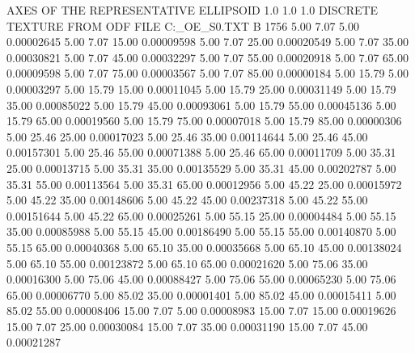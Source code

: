 AXES OF THE REPRESENTATIVE ELLIPSOID
   1.0   1.0   1.0
DISCRETE TEXTURE FROM ODF FILE  C:\TEXTURES\STEEL_OE\STEEL_S0.TXT       
B    1756
      5.00      7.07      5.00     0.00002645
      5.00      7.07     15.00     0.00009598
      5.00      7.07     25.00     0.00020549
      5.00      7.07     35.00     0.00030821
      5.00      7.07     45.00     0.00032297
      5.00      7.07     55.00     0.00020918
      5.00      7.07     65.00     0.00009598
      5.00      7.07     75.00     0.00003567
      5.00      7.07     85.00     0.00000184
      5.00     15.79      5.00     0.00003297
      5.00     15.79     15.00     0.00011045
      5.00     15.79     25.00     0.00031149
      5.00     15.79     35.00     0.00085022
      5.00     15.79     45.00     0.00093061
      5.00     15.79     55.00     0.00045136
      5.00     15.79     65.00     0.00019560
      5.00     15.79     75.00     0.00007018
      5.00     15.79     85.00     0.00000306
      5.00     25.46     25.00     0.00017023
      5.00     25.46     35.00     0.00114644
      5.00     25.46     45.00     0.00157301
      5.00     25.46     55.00     0.00071388
      5.00     25.46     65.00     0.00011709
      5.00     35.31     25.00     0.00013715
      5.00     35.31     35.00     0.00135529
      5.00     35.31     45.00     0.00202787
      5.00     35.31     55.00     0.00113564
      5.00     35.31     65.00     0.00012956
      5.00     45.22     25.00     0.00015972
      5.00     45.22     35.00     0.00148606
      5.00     45.22     45.00     0.00237318
      5.00     45.22     55.00     0.00151644
      5.00     45.22     65.00     0.00025261
      5.00     55.15     25.00     0.00004484
      5.00     55.15     35.00     0.00085988
      5.00     55.15     45.00     0.00186490
      5.00     55.15     55.00     0.00140870
      5.00     55.15     65.00     0.00040368
      5.00     65.10     35.00     0.00035668
      5.00     65.10     45.00     0.00138024
      5.00     65.10     55.00     0.00123872
      5.00     65.10     65.00     0.00021620
      5.00     75.06     35.00     0.00016300
      5.00     75.06     45.00     0.00088427
      5.00     75.06     55.00     0.00065230
      5.00     75.06     65.00     0.00006770
      5.00     85.02     35.00     0.00001401
      5.00     85.02     45.00     0.00015411
      5.00     85.02     55.00     0.00008406
     15.00      7.07      5.00     0.00008983
     15.00      7.07     15.00     0.00019626
     15.00      7.07     25.00     0.00030084
     15.00      7.07     35.00     0.00031190
     15.00      7.07     45.00     0.00021287
